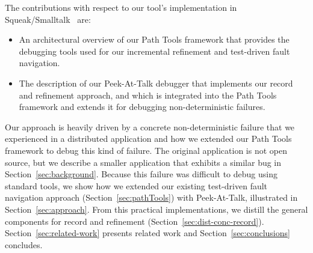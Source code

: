\documentclass[preprint,3p]{elsarticle}
\newcommand{\toolname}{Peek-At-Talk\xspace}
\begin{document}
The contributions with respect to our tool's implementation in
Squeak/Smalltalk~\cite{Ingalls1997} are:
\begin{itemize}
\item An architectural overview of our Path Tools framework that provides the
  debugging tools used for our incremental refinement and test-driven fault
  navigation.
\item The description of our \toolname debugger that implements our record and
  refinement approach, and which is integrated into the Path Tools framework and
  extends it for debugging non-deterministic failures.
\end{itemize}

Our approach is heavily driven by a concrete non-deterministic failure that we
experienced in a distributed application and how we extended our Path Tools
framework to debug this kind of failure. The original application is not open
source, but we describe a smaller application that exhibits a similar bug in
Section~\ref{sec:background}. Because this failure was difficult to debug using
standard tools, we show how we extended our existing test-driven fault
navigation approach (Section~\ref{sec:pathTools}) with \toolname, illustrated in
Section~\ref{sec:approach}. From this practical implementations, we distill the
general components for record and refinement
(Section~\ref{sec:dist-conc-record}). Section~\ref{sec:related-work} presents
related work and Section~\ref{sec:conclusions} concludes.








\end{document}
